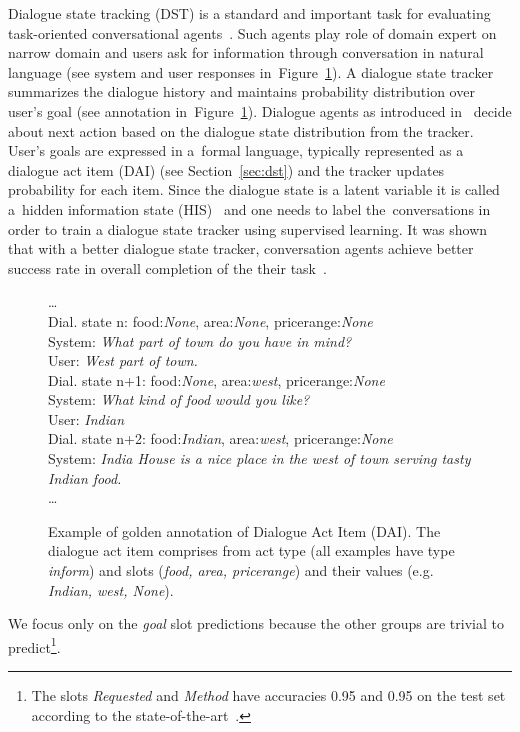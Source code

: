\documentclass{itatnew}
\def\area#1{{\color{darkgreen}area:\it #1}}
\def\food#1#2{{Dial. state #1: \color{blue}food:\it #2}}
\def\pricerange#1{{\color{orange}pricerange:\it #1}}
\def\sys#1{{\color{purple}System: \it #1}}
\def\usr#1{{\color{brown}User: \it #1}}
\begin{document}
Dialogue state tracking (DST) is a standard and important task for evaluating task-oriented conversational agents~\cite{williams2013dialog, henderson2014second, henderson2014third}.
Such agents play role of domain expert on narrow domain and users ask for information through conversation in natural language (see system and user responses in~Figure~\ref{fig:example}).
A dialogue state tracker summarizes the dialogue history and maintains probability distribution over user's goal (see annotation in~Figure~\ref{fig:example}).
Dialogue agents as introduced in~\cite{young2010hidden} decide about next action based on the dialogue state distribution from the tracker.
User's goals are expressed in a~formal language, typically represented as a dialogue act item (DAI) (see Section~\ref{sec:dst}) and the tracker updates probability for each item.
Since the dialogue state is a latent variable it is called a~hidden information state (HIS)~\cite{young2010hidden} and one needs to label the~conversations in order to train a dialogue state tracker using supervised learning.
It was shown that with a better dialogue state tracker, conversation agents achieve better success rate in overall completion of the their task~\cite{jurvcivcek2012reinforcement}.

\begin{figure}
   \dots \\
    \food{n}{None}, \area{None}, \pricerange{None} \\
    \sys{What part of town do you have in mind?} \\
    \usr{West part of town.} \\
    \food{n+1}{None}, \area{west}, \pricerange{None} \\
    \sys{What kind of food would you like?} \\
    \usr{Indian} \\
    \food{n+2}{Indian}, \area{west}, \pricerange{None} \\
    \sys{India House is a nice place in the west of town serving tasty Indian food.} \\
    \dots
    \caption{Example of golden annotation of Dialogue Act Item (DAI). The dialogue act item comprises from act type (all examples have type {\it inform}) and slots ({\it food, area, pricerange}) and their values (e.g. {\it Indian, west, None}).}
\vspace{-0.70em}
\label{fig:example}
\end{figure}

We focus only on the {\it goal} slot predictions because the other groups are trivial to predict\footnote{The slots {\it Requested} and {\it Method} have accuracies 0.95 and 0.95 on the test set according to the state-of-the-art~\cite{williams2014web}.}.
\end{document}
